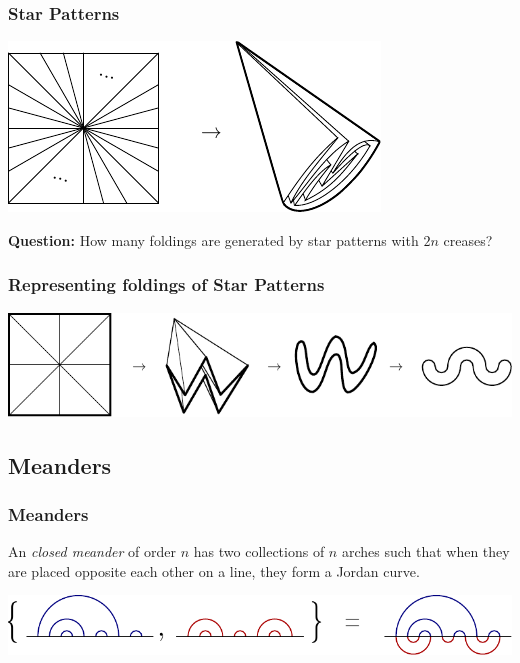 \documentclass{beamer}
\begin{document}
\begin{frame}
\frametitle{Star Patterns}
\pause
\begin{center}
\includegraphics[width=.8\textwidth]{meanders/star-cp.pdf}
\end{center}
\pause
\textbf{Question:} How many foldings are generated by star patterns with $2n$ creases?
\end{frame}

\begin{frame}
\frametitle{Representing foldings of Star Patterns}
\pause
\begin{center}
\includegraphics[width=\textwidth]{meanders/star-to-meander.pdf}
\end{center}
\end{frame}

\subsection{Meanders}
\begin{frame}
\frametitle{Meanders}
\begin{definition}
An \emph{closed meander} of order $n$ has two collections of $n$ arches such that when they are placed opposite each other on a line, they form a Jordan curve.
\end{definition}
\begin{center}
\includegraphics[width=.8\textwidth]{meanders/meander-defn.pdf}
\end{center}
\end{frame}
\end{document}
